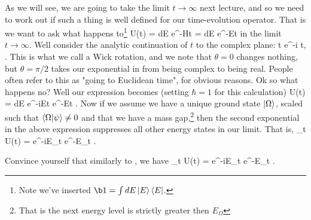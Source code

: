 As we will see, we are going to take the limit $t\to\infty$ next lecture, and so we need to work out if such a thing is well defined for our time-evolution operator. That is we want to ask what happens to\footnote{Note we've inserted $\b1=\int dE \ket{E}\bra{E}$.}
\be 
\label{eqn:UWickRotation}
    U(t)\ket{\psi} = \int dE e^{-Ht}  = \int dE e^{-Et} 
\ee 
in the limit $t\to\infty$. Well consider the analytic continuation of $t$ to the complex plane:
\be 
\label{eqn:WickRotation}
    t \to e^{-i\theta} t, \qquad \theta\in [0,\pi/2].
\ee  
This is what we call a Wick rotation, and we note that $\theta=0$ changes nothing, but $\theta=\pi/2$ takes our exponential in  from being complex to being real. People often refer to this as "going to Euclidean time", for obvious reasons. Ok so what happens no? Well our expression becomes (setting $\hbar=1$ for this calculation)
\bse 
    U(t)\ket{\psi} = \int dE e^{-i\cos\theta Et} e^{-\sin\theta Et} .
\ese 
Now if we assume we have a unique ground state $\ket{\Omega}$, scaled such that $\braket{\Omega}{\psi} \neq 0$ and that we have a mass gap,\footnote{That is the next energy level is strictly greater then $E_{\Omega}$} then the second exponential in the above expression suppresses all other energy states in our limit. That is, 
\be 
\label{eqn:UWickRotationLimit}
    \lim_{t\to\infty} U(t)\ket{\psi} = e^{-i\cos\theta E_{\Omega}t} e^{-\sin\theta E_{\Omega}t} \ket{\Omega}\braket{\Omega}{\psi}.
\ee 

\bbox 
    Convince yourself that similarly to , we have 
    \bse 
        \lim_{t\to\infty} \bra{\psi}U(t) = e^{-i\cos\theta E_{\Omega}t} e^{-\sin\theta E_{\Omega}t} \bra{\Omega}\braket{\psi}{\Omega}.
    \ese 
\ebox 